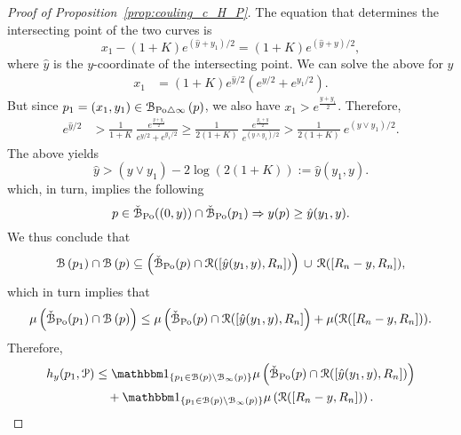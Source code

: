 \begin{proof}[Proof of Proposition~\ref{prop:couling_c_H_P}]
The equation that determines the intersecting point of the two curves is
\[
	x_1 - (1+K)e^{(\hat{y} + y_1)/2}= (1+K) e^{(\hat{y} + y)/2},
\]
where $\hat{y}$ is the $y$-coordinate of the intersecting point. 
We can solve the above for $\hat{y}$  
\begin{equation*} 
\begin{split}
x_1 &=(1+K) e^{\hat{y}/2} \left( e^{y/2} + e^{y_1/2} \right).
\end{split}
\end{equation*}
But since $p_1=(x_1,y_1)  \in {\mathcal B}_{{\mathrm{Po}} \bigtriangleup \infty}\left(p\right)$, we also have $x_1 > e^{\frac{y + y_1}{2}}$. Therefore, 
\begin{equation*}
\begin{split}
 e^{\hat{y}/2}& > \frac{1}{1+K}~\frac{e^{\frac{y + y_1}{2}}}{ e^{y/2}+ e^{y_1/2}} \geq 
\frac{1}{2(1+K)}~\frac{e^{\frac{y_1 + y}{2}}}{ e^{(y \wedge y_1) /2}} 
> \frac{1}{2(1 + K)} ~ e^{(y \vee y_1)/2}. 
 \end{split}
\end{equation*}
The above yields
\begin{equation} \label{eq:to_use_I}
\hat{y} > (y \vee y_1) - 2\log(2(1+K)) := \hat{y}(y_1, y). 
\end{equation}
which, in turn, implies the following 
\begin{equation}\label{eq:intersex_approx}
	p \in \check{{\mathcal B}}_{{\mathrm{Po}}}((0,y))\cap \check{{\mathcal B}}_{{\mathrm{Po}}}(p_1) \Rightarrow y(p) \ge \hat{y}(y_1,y).
\end{equation}
We thus conclude that 
\[ 
	{\mathcal B}\left(p_1\right) \cap {\mathcal B}\left(p\right) \subseteq \left(\check{{\mathcal B}}_{{\mathrm{Po}}}(p) \cap {\mathcal R}([\hat{y}(y_1,y), R_n])\right)
	\, \cup \, {\mathcal R} ([R_n - y,R_n]),
\]
which in turn implies that
\[
	\mu \left( \check{{\mathcal B}}_{{\mathrm{Po}}}(p_1) \cap {\mathcal B}\left(p\right) \right) \leq 
	\mu\left( \check{{\mathcal B}}_{{\mathrm{Po}}}(p) \cap  {\mathcal R}([\hat{y}(y_1,y), R_n]\right) + 
	\mu ({\mathcal R} ([R_n - y, R_n]) ).
\]
Therefore, 
\begin{align*} 
	h_y(p_1, \Pcal) &\leq \ind{p_1 \in \BallHyp{p}\setminus \BallPo{p}} 
    	\mu  \left( \FatBallHyp{p} \cap  \Rcal([\hat{y}(y_1,y), R_n])\right)
        \\
	&\hspace{10pt}+ \ind{p_1 \in \BallHyp{p}\setminus \BallPo{p}}
    	\mu  \left( \Rcal ([R_n - y, R_n]) \right).
\end{align*}




\end{proof}
